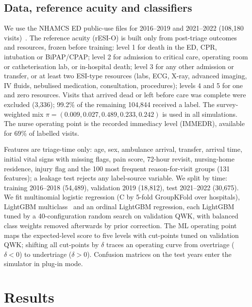 \documentclass[conference]{IEEEtran}
\begin{document}
\subsection{Data, reference acuity and classifiers}\label{sec:data}
We use the NHAMCS ED public-use files for 2016--2019 and 2021--2022 (108,180
visits)~\cite{nhamcs}. The reference acuity (rESI-O) is built only from post-triage
outcomes and resources, frozen before training: level 1 for death in the ED, CPR,
intubation or BiPAP/CPAP; level 2 for admission to critical care, operating room or
catheterisation lab, or in-hospital death; level 3 for any other admission or transfer,
or at least two ESI-type resources (labs, ECG, X-ray, advanced imaging, IV fluids,
nebulised medication, consultation, procedures); levels 4 and 5 for one and zero resources.
Visits that arrived dead or left before care was complete were excluded (3,336); 99.2\%
of the remaining 104,844 received a label. The survey-weighted mix
$\pi=(0.009,0.027,0.489,0.233,0.242)$ is used in all simulations.
The nurse operating point is the recorded immediacy level (IMMEDR), available for 69\%
of labelled visits.

Features are triage-time only: age, sex, ambulance arrival, transfer, arrival time,
initial vital signs with missing flags, pain score, 72-hour revisit, nursing-home
residence, injury flag and the 100 most frequent reason-for-visit groups (131 features);
a leakage test rejects any label-source variable. We split by time: training 2016--2018
(54,489), validation 2019 (18,812), test 2021--2022 (30,675). We fit multinomial logistic
regression (C by 5-fold GroupKFold over hospitals), LightGBM multiclass~\cite{ke2017lightgbm}
and an ordinal LightGBM regression, each LightGBM tuned by a 40-configuration random
search on validation QWK, with balanced class weights removed afterwards by prior
correction. The ML operating point maps the expected-level score to five levels with
cut-points tuned on validation QWK; shifting all cut-points by $\delta$ traces an
operating curve from overtriage ($\delta<0$) to undertriage ($\delta>0$). Confusion
matrices on the test years enter the simulator in plug-in mode.

\section{Results}
\end{document}
